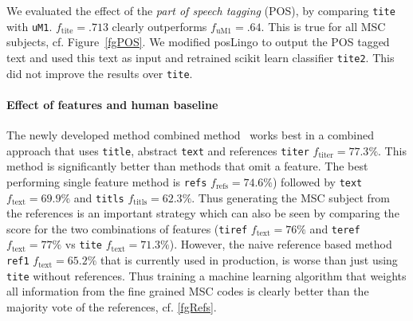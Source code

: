 We evaluated the effect of the \emph{part of speech tagging} (POS), by comparing \texttt{tite} with \texttt{uM1}. $f_\mathrm{tite}=.713$ clearly outperforms $f_\mathrm{uM1}=.64.$ This is true for all MSC subjects, cf. Figure~\ref{fgPOS}. We modified posLingo to output the POS tagged text and used this text as input and retrained scikit learn classifier \texttt{tite2}. This did not improve the results over \texttt{tite}.

\paragraph{Effect of features and human baseline}
The newly developed method combined method~\cite{Scharpf2020} works best in a combined approach that uses \texttt{title}, abstract \texttt{text} and references \texttt{titer} $f_\mathrm{titer}=77.3\%.$
This method is significantly better than methods that omit a feature.
The best performing single feature method is \texttt{refs} $f_\mathrm{refs}=74.6\%$) followed by \texttt{text} $f_\mathrm{text}=69.9\%$ and \texttt{titls} $f_\mathrm{titls}=62.3\%$.
Thus generating the MSC subject from the references is an important strategy which can also be seen by comparing the score for the two combinations of features (\texttt{tiref} $f_\mathrm{text}=76\%$ and \texttt{teref} $f_\mathrm{text}=77\%$ vs \texttt{tite} $f_\mathrm{text}=71.3\%$).
However, the naive reference based method \texttt{ref1} $f_\mathrm{text}=65.2\%$ that is currently used in production, is worse than just using \texttt{tite} without references.
Thus training a machine learning algorithm that weights all information from the fine grained MSC codes is clearly better than the majority vote of the references, cf. \ref{fgRefs}.



